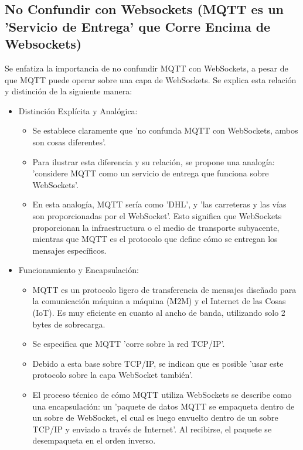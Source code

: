 \documentclass{report}
\begin{document}
\subsection{No Confundir con Websockets (MQTT es un  'Servicio de Entrega' que Corre Encima de Websockets)}
Se enfatiza la importancia de no confundir MQTT con WebSockets, a pesar de que MQTT puede operar sobre 
una capa de WebSockets. Se explica esta relación y distinción de la siguiente manera:
\begin{itemize}
    \item Distinción Explícita y Analógica:
        \begin{itemize}
            \item Se establece claramente que 'no confunda MQTT con WebSockets, ambos son cosas diferentes'.
            \item Para ilustrar esta diferencia y su relación, se propone una analogía: 'considere MQTT como un servicio de entrega que funciona sobre WebSockets'.
            \item En esta analogía, MQTT sería como 'DHL', y 'las carreteras y las vías son proporcionadas por el WebSocket'. Esto significa que WebSockets proporcionan la infraestructura o el medio de transporte subyacente, mientras que MQTT es el protocolo que define cómo se entregan los mensajes específicos.
        \end{itemize}
    \item Funcionamiento y Encapsulación:
        \begin{itemize}
            \item MQTT es un protocolo ligero de transferencia de mensajes diseñado para la comunicación máquina a máquina (M2M) y el Internet de las Cosas (IoT). Es muy eficiente en cuanto al ancho de banda, utilizando solo 2 bytes de sobrecarga.
            \item Se especifica que MQTT 'corre sobre la red TCP/IP'.
            \item Debido a esta base sobre TCP/IP, se  indican que es posible 'usar este protocolo sobre la capa WebSocket también'.
            \item El proceso técnico de cómo MQTT utiliza WebSockets se describe como una encapsulación: un 'paquete de datos MQTT se empaqueta dentro de un sobre de WebSocket, el cual es luego envuelto dentro de un sobre TCP/IP y enviado a través de Internet'. Al recibirse, el paquete se desempaqueta en el orden inverso.

\end{itemize}
\end{itemize}
\end{document}
